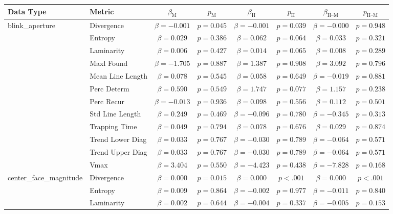 \begin{tabular}{llcc|cc|cc}
\toprule
Data Type & Metric & $\beta_{\text{M}}$ & $p_{\text{M}}$ & $\beta_{\text{H}}$ & $p_{\text{H}}$ & $\beta_{\text{H--M}}$ & $p_{\text{H--M}}$ \\
\midrule
\multirow{12}{*}{blink_aperture} & Divergence & $\beta = -0.001$ & $p = 0.045$ & $\beta = -0.001$ & $p = 0.039$ & $\beta = -0.000$ & $p = 0.948$ \\
 & Entropy & $\beta = 0.029$ & $p = 0.386$ & $\beta = 0.062$ & $p = 0.064$ & $\beta = 0.033$ & $p = 0.321$ \\
 & Laminarity & $\beta = 0.006$ & $p = 0.427$ & $\beta = 0.014$ & $p = 0.065$ & $\beta = 0.008$ & $p = 0.289$ \\
 & Maxl Found & $\beta = -1.705$ & $p = 0.887$ & $\beta = 1.387$ & $p = 0.908$ & $\beta = 3.092$ & $p = 0.796$ \\
 & Mean Line Length & $\beta = 0.078$ & $p = 0.545$ & $\beta = 0.058$ & $p = 0.649$ & $\beta = -0.019$ & $p = 0.881$ \\
 & Perc Determ & $\beta = 0.590$ & $p = 0.549$ & $\beta = 1.747$ & $p = 0.077$ & $\beta = 1.157$ & $p = 0.238$ \\
 & Perc Recur & $\beta = -0.013$ & $p = 0.936$ & $\beta = 0.098$ & $p = 0.556$ & $\beta = 0.112$ & $p = 0.501$ \\
 & Std Line Length & $\beta = 0.249$ & $p = 0.469$ & $\beta = -0.096$ & $p = 0.780$ & $\beta = -0.345$ & $p = 0.313$ \\
 & Trapping Time & $\beta = 0.049$ & $p = 0.794$ & $\beta = 0.078$ & $p = 0.676$ & $\beta = 0.029$ & $p = 0.874$ \\
 & Trend Lower Diag & $\beta = 0.033$ & $p = 0.767$ & $\beta = -0.030$ & $p = 0.789$ & $\beta = -0.064$ & $p = 0.571$ \\
 & Trend Upper Diag & $\beta = 0.033$ & $p = 0.767$ & $\beta = -0.030$ & $p = 0.789$ & $\beta = -0.064$ & $p = 0.571$ \\
 & Vmax & $\beta = 3.404$ & $p = 0.550$ & $\beta = -4.423$ & $p = 0.438$ & $\beta = -7.828$ & $p = 0.168$ \\
\midrule
\multirow{12}{*}{center_face_magnitude} & Divergence & $\beta = 0.000$ & $p = 0.015$ & $\beta = 0.000$ & $p < .001$ & $\beta = 0.000$ & $p < .001$ \\
 & Entropy & $\beta = 0.009$ & $p = 0.864$ & $\beta = -0.002$ & $p = 0.977$ & $\beta = -0.011$ & $p = 0.840$ \\
 & Laminarity & $\beta = 0.002$ & $p = 0.644$ & $\beta = -0.004$ & $p = 0.337$ & $\beta = -0.005$ & $p = 0.153$ \\

\end{tabular}
